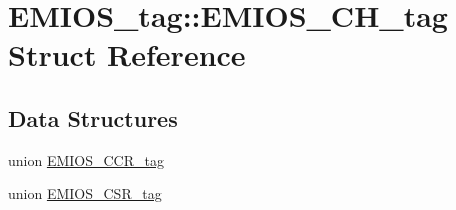 \hypertarget{structEMIOS__tag_1_1EMIOS__CH__tag}{}\section{E\+M\+I\+O\+S\+\_\+tag\+::E\+M\+I\+O\+S\+\_\+\+C\+H\+\_\+tag Struct Reference}
\label{structEMIOS__tag_1_1EMIOS__CH__tag}
\subsection*{Data Structures}
\begin{DoxyCompactItemize}
\item 
union \mbox{\hyperlink{unionEMIOS__tag_1_1EMIOS__CH__tag_1_1EMIOS__CCR__tag}{E\+M\+I\+O\+S\+\_\+\+C\+C\+R\+\_\+tag}}
\item 
union \mbox{\hyperlink{unionEMIOS__tag_1_1EMIOS__CH__tag_1_1EMIOS__CSR__tag}{E\+M\+I\+O\+S\+\_\+\+C\+S\+R\+\_\+tag}}
\end{DoxyCompactItemize}
